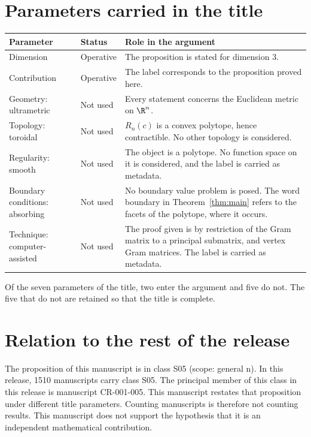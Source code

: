 \documentclass[11pt]{article}
\begin{document}
\section{Parameters carried in the title}\label{sec:params}
\begin{center}
\small
\begin{tabular}{p{}p{}p{}}
\toprule
Parameter & Status & Role in the argument \\
\midrule
Dimension & Operative & The proposition is stated for dimension $3$. \\
Contribution & Operative & The label corresponds to the proposition proved here. \\
Geometry: ultrametric & Not used & Every statement concerns the Euclidean metric on $\R^n$. \\
Topology: toroidal & Not used & $R_n(c)$ is a convex polytope, hence contractible. No other topology is considered. \\
Regularity: smooth & Not used & The object is a polytope. No function space on it is considered, and the label is carried as metadata. \\
Boundary conditions: absorbing & Not used & No boundary value problem is posed. The word boundary in Theorem~\ref{thm:main} refers to the facets of the polytope, where it occurs. \\
Technique: computer-assisted & Not used & The proof given is by restriction of the Gram matrix to a principal submatrix, and vertex Gram matrices. The label is carried as metadata. \\
\bottomrule
\end{tabular}
\end{center}
Of the seven parameters of the title, two enter the argument and five do not. The five that do not are retained so that the title is complete.

\section{Relation to the rest of the release}
The proposition of this manuscript is in class S05 (scope: general n).
In this release, 1510 manuscripts carry class S05. The principal member of this class in this release is manuscript CR-001-005. This manuscript restates that proposition under different title parameters.
Counting manuscripts is therefore not counting results. This manuscript does not support the hypothesis that it is an independent mathematical contribution.
\end{document}
